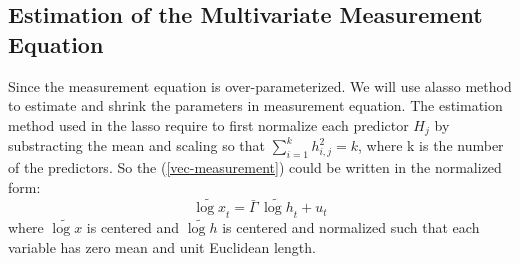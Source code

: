 \documentclass[titlepage,11pt]{article}
\begin{document}
\subsection{Estimation of the Multivariate Measurement Equation}
Since the measurement equation is over-parameterized. We will use alasso method to estimate and shrink the parameters in measurement equation. The estimation method used in the lasso require to first normalize each predictor $H_j$ by  substracting the mean and scaling so that $\sum_{i=1}^{k}h_{i,j}^2 = k$, where k is the number of the predictors. So the (\ref{vec-measurement}) could be written in the normalized form:
\begin{equation}
\label{lasso-measurement}
 \tilde{\log x}_t=  \bar{\Gamma} \,  \tilde{\log h}_{t}+ u_{t}
\end{equation}
where $\tilde{\log x}$ is centered and $\tilde{\log h}$ is centered and normalized such that each variable has zero mean and unit Euclidean length.
\end{document}
